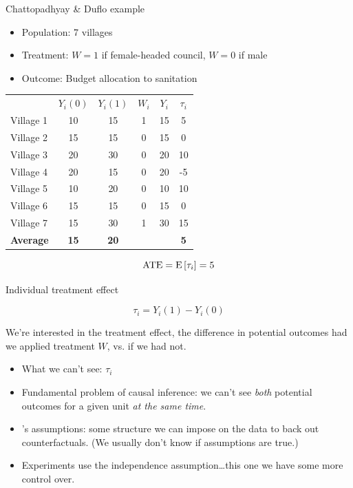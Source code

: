 \documentclass[xcolor={dvipsnames},handout]{beamer}
\begin{document}
\begin{frame}{Chattopadhyay \& Duflo example}

\begin{itemize}
\item Population: 7 villages
\item Treatment: $W = 1$ if female-headed council, $W = 0$ if male
\item Outcome: Budget allocation to sanitation
\end{itemize}

\begin{table}[]
\begin{tabular}{lccccc}
& $Y_i(0)$ & $Y_i(1)$ & $W_i$ & $Y_i$ & $\tau_i$ \\
Village 1 & 10 & 15 & 1 & 15 & 5 \\
Village 2 & 15 & 15 & 0 & 15 & 0 \\
Village 3 & 20 & 30 & 0 & 20 & 10 \\
Village 4 & 20 & 15 & 0 & 20 & -5 \\
Village 5 & 10 & 20 & 0 & 10 & 10 \\
Village 6 & 15 & 15 & 0 & 15 & 0 \\
Village 7 & 15 & 30 & 1 & 30 & 15 \\
{\textbf{Average}} & {\textbf{15}} & {\textbf{20}} & & &{\textbf{5}}
\end{tabular}
\end{table}

$$
\text{ATE} = {{\textrm E}\,[\tau_i]=5}
$$

\end{frame}



\begin{frame}{Individual treatment effect}

$$
\tau_i = Y_i(1)-Y_i(0)
$$

We're interested in the treatment effect, the difference in potential outcomes had we applied treatment $W$, vs. if we had not.

\begin{itemize}
\item What we can't see: $\tau_i$
\item Fundamental problem of causal inference: we can't see \textit{both} potential outcomes for a given unit \textit{at the same time}.
\item  \cite{holland1986statistics}'s assumptions: some structure we can impose on the data to back out counterfactuals. (We usually don't know if assumptions are true.)
\item Experiments use the independence assumption\dots this one we have some more control over.
\end{itemize}

\end{frame}
\end{document}
